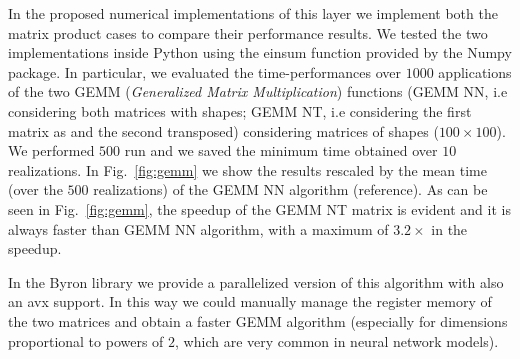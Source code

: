 \documentclass{standalone}
\begin{document}
In the proposed numerical implementations of this layer we implement both the matrix product cases to compare their performance results.
We tested the two implementations inside \textsf{Python} using the \textsf{einsum} function provided by the \textsf{Numpy} package.
In particular, we evaluated the time-performances over $1000$ applications of the two \textsf{GEMM} (\emph{Generalized Matrix Multiplication}) functions (\textsf{GEMM NN}, i.e considering both matrices with  shapes; \textsf{GEMM NT}, i.e considering the first matrix as  and the second transposed) considering matrices of shapes ($100\times100$).
We performed $500$ run and we saved the minimum time obtained over $10$ realizations.
In Fig.~\ref{fig:gemm} we show the results rescaled by the mean time (over the $500$ realizations) of the \textsf{GEMM NN} algorithm (reference).
As can be seen in Fig.~\ref{fig:gemm}, the speedup of the \textsf{GEMM NT} matrix is evident and it is always faster than \textsf{GEMM NN} algorithm, with a maximum of $3.2\times$ in the speedup.

In the \textsf{Byron} library we provide a parallelized version of this algorithm with also an \textsf{avx} support.
In this way we could manually manage the register memory of the two matrices and obtain a faster \textsf{GEMM} algorithm (especially for dimensions proportional to powers of $2$, which are very common in neural network models).
\end{document}
